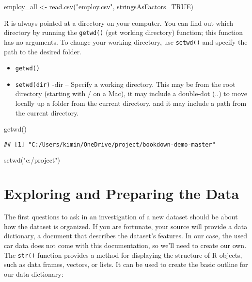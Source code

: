 \documentclass[
]{book}
\newenvironment{Shaded}{\begin{snugshade}}{\end{snugshade}}
\newcommand{\AttributeTok}[1]{\textcolor[rgb]{0.77,0.63,0.00}{#1}}
\newcommand{\ConstantTok}[1]{\textcolor[rgb]{0.00,0.00,0.00}{#1}}
\newcommand{\FunctionTok}[1]{\textcolor[rgb]{0.00,0.00,0.00}{#1}}
\newcommand{\NormalTok}[1]{#1}
\newcommand{\OtherTok}[1]{\textcolor[rgb]{0.56,0.35,0.01}{#1}}
\newcommand{\StringTok}[1]{\textcolor[rgb]{0.31,0.60,0.02}{#1}}
\providecommand{\tightlist}{%
  \setlength{\itemsep}{0pt}\setlength{\parskip}{0pt}}
\begin{document}
\begin{Shaded}
\begin{Highlighting}[]
\NormalTok{employ\_all }\OtherTok{\textless{}{-}} \FunctionTok{read.csv}\NormalTok{(}\StringTok{"employ.csv"}\NormalTok{, }\AttributeTok{stringsAsFactors=}\ConstantTok{TRUE}\NormalTok{)}
\end{Highlighting}
\end{Shaded}

R is always pointed at a directory on your computer. You can find out which directory by running the \texttt{getwd()} (get working directory) function; this function has no arguments. To change your working directory, use \texttt{setwd()} and specify the path to the desired folder.

\begin{itemize}
\tightlist
\item
  \texttt{getwd()}
\item
  \texttt{setwd(dir)}
  -dir -- Specify a working directory. This may be from the root directory (starting with / on a Mac), it may include a double-dot (..) to move locally up a folder from the current directory, and it may include a path from the current directory.
\end{itemize}

\begin{Shaded}
\begin{Highlighting}[]
\FunctionTok{getwd}\NormalTok{()}
\end{Highlighting}
\end{Shaded}

\begin{verbatim}
## [1] "C:/Users/kimin/OneDrive/project/bookdown-demo-master"
\end{verbatim}

\begin{Shaded}
\begin{Highlighting}[]
\FunctionTok{setwd}\NormalTok{(}\StringTok{"c:/project"}\NormalTok{)}
\end{Highlighting}
\end{Shaded}

\hypertarget{exploring-and-preparing-the-data}{%
\section{Exploring and Preparing the Data}\label{exploring-and-preparing-the-data}}

The first questions to ask in an investigation of a new dataset should be about
how the dataset is organized. If you are fortunate, your source will provide a data
dictionary, a document that describes the dataset's features. In our case, the used
car data does not come with this documentation, so we'll need to create our own.
The \texttt{str()} function provides a method for displaying the structure of R objects,
such as data frames, vectors, or lists. It can be used to create the basic outline for our data dictionary:
\end{document}
